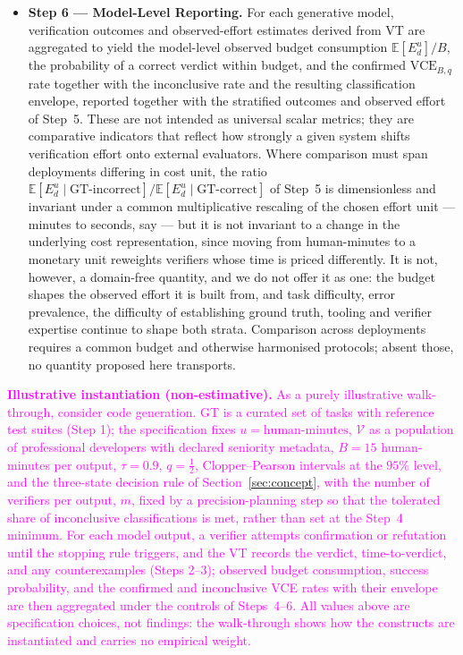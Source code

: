 \documentclass[11pt]{article}
\newcommand{\rev}[1]{\textcolor{magenta}{#1}}
\newcommand{\viola}[1]{\textcolor[HTML]{7030A0}{#1}}
\newcommand{\rev}[1]{#1}
\newcommand{\viola}[1]{#1}
\begin{document}
\begin{itemize}
    \item \textbf{Step 6 --- Model-Level Reporting.} {For each generative model, \viola{verification outcomes and observed-effort estimates derived from VT are aggregated} to yield \viola{the model-level observed budget consumption \mbox{$\mathbb{E}[E_d^u]/B$}, the probability of a correct verdict within budget, \viola{and the confirmed \mbox{$\mathrm{VCE}_{B,q}$} rate together with the inconclusive rate and the resulting classification envelope,} \viola{reported together with the stratified outcomes and observed effort of Step~5.} These are not intended as universal scalar metrics; they are comparative indicators that reflect how strongly a given system shifts verification effort onto external evaluators.}}
    \viola{Where comparison must span deployments differing in cost unit, the ratio \mbox{$\mathbb{E}[E_d^u \mid \text{GT-incorrect}]/\mathbb{E}[E_d^u \mid \text{GT-correct}]$} of Step~5 is dimensionless and invariant under a common multiplicative rescaling of the chosen effort unit --- minutes to seconds, say --- but it is not invariant to a change in the underlying cost representation, since moving from human-minutes to a monetary unit reweights verifiers whose time is priced differently. It is not, however, a domain-free quantity, and we do not offer it as one: \viola{the budget shapes the observed effort it is built from}, and task difficulty, error prevalence, the difficulty of establishing ground truth, tooling and verifier expertise continue to shape both strata. Comparison across deployments requires a common budget and otherwise harmonised protocols; absent those, no quantity proposed here transports.}
\end{itemize}

\rev{\textbf{Illustrative instantiation (non-estimative).} As a purely illustrative walk-through, consider code generation. GT is a curated set of tasks with reference test suites (Step 1); the specification fixes $u=\text{human-minutes}$, $\mathcal{V}$ as a population of professional developers with declared seniority metadata, $B=15$ human-minutes per output, $\tau=0.9$, \viola{$q=\tfrac12$, Clopper--Pearson intervals at the $95\%$ level, and the three-state decision rule of Section~\ref{sec:concept}, \viola{with the number of verifiers per output, $m$, fixed by a precision-planning step so that the tolerated share of inconclusive classifications is met, rather than set at the Step~4 minimum}}. For each model output, a verifier attempts confirmation or refutation until the stopping rule triggers, and the VT records the verdict, time-to-verdict, and any counterexamples (Steps 2--3); \viola{observed budget consumption, success probability, and the confirmed and inconclusive VCE rates with their envelope are then aggregated under the controls of Steps~4--6.} All values above are specification choices, not findings: the walk-through shows how the constructs are instantiated and carries no empirical weight.}
\end{document}
